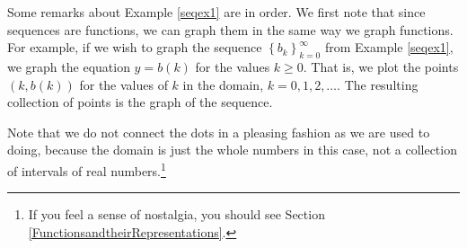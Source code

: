 \documentclass{ximera}
\begin{document}
Some remarks about Example \ref{seqex1} are in order. We first note that since sequences are functions, we can graph them in the same way we graph functions.  For example, if we wish to graph the sequence $\left\{ b_{k} \right\}_{k=0}^{\infty}$ from Example \ref{seqex1}, we graph the equation $y=b(k)$ for the values $k \geq 0$. That is, we plot the points $(k, b(k))$ for the values of $k$ in the domain, $k = 0, 1, 2, \ldots$.  The resulting collection of points is the graph of the sequence. 

\begin{image}
\end{image}

Note that we do not connect the dots in a pleasing fashion as we are used to doing, because the domain is just the whole numbers in this case, not a collection of intervals of real numbers.\footnote{If you feel a sense of nostalgia, you should see Section \ref{FunctionsandtheirRepresentations}.}
\end{document}
